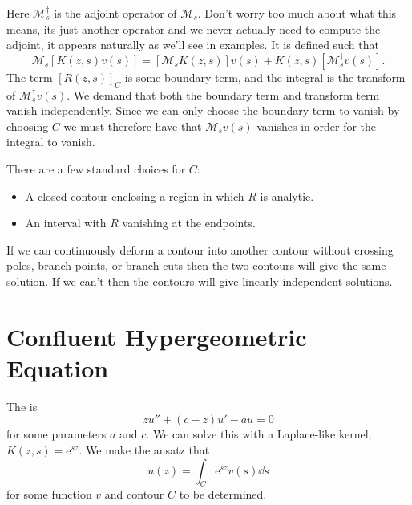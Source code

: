 \documentclass[fleqn]{NotesClass}
\newcommand*{\e}{\mathrm{e}}
\newcommand*{\hermit}{\dagger}
\begin{document}
    Here \(\mathcal{M}_s^\hermit\) is the adjoint operator of \(\mathcal{M}_s\).
    Don't worry too much about what this means, its just another operator and we never actually need to compute the adjoint, it appears naturally as we'll see in examples.
    It is defined such that
    \begin{equation}
        \mathcal{M}_s[K(z, s)v(s)] = [\mathcal{M}_sK(z, s)]v(s) + K(z, s)[\mathcal{M}_s^\hermit v(s)].
    \end{equation}
    The term \([R(z, s)]_C\) is some boundary term, and the integral is the transform of \(\mathcal{M}_s^\hermit v(s)\).
    We demand that both the boundary term and transform term vanish independently.
    Since we can only choose the boundary term to vanish by choosing \(C\) we must therefore have that \(\mathcal{M}_sv(s)\) vanishes in order for the integral to vanish.
    
    There are a few standard choices for \(C\):
    \begin{itemize}
        \item A closed contour enclosing a region in which \(R\) is analytic.
        \item An interval with \(R\) vanishing at the endpoints.
    \end{itemize}
    If we can continuously deform a contour into another contour without crossing poles, branch points, or branch cuts then the two contours will give the same solution.
    If we can't then the contours will give linearly independent solutions.
    
    \section{Confluent Hypergeometric Equation}
    The  is
    \begin{equation}
        zu'' + (c - z)u' - au = 0
    \end{equation}
    for some parameters \(a\) and \(c\).
    We can solve this with a Laplace-like kernel, \(K(z, s) = \e^{sz}\).
    We make the ansatz that
    \begin{equation}
        u(z) = \int_C \e^{sz}v(s) \dd{s}
    \end{equation}
    for some function \(v\) and contour \(C\) to be determined.
    
\end{document}
